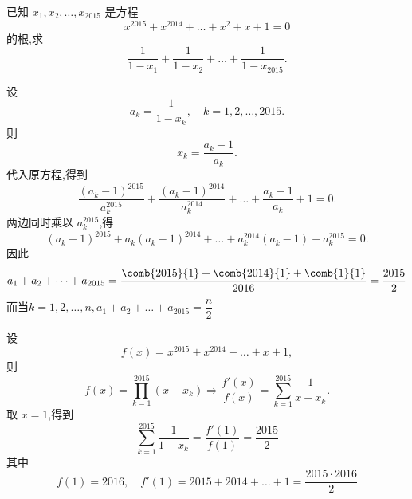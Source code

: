 \begin{questions}
    \question 已知 $x_1, x_2, \ldots, x_{2015}$ 是方程
    \[
    x^{2015}+x^{2014}+\dots+x^2+x+1=0
    \]
    的根,求
    \[
    \frac{1}{1-x_1}+\frac{1}{1-x_2}+\dots+\frac{1}{1-x_{2015}}.
    \]
    \begin{solution}
        设 
        \[
        a_k = \frac{1}{1-x_k}, \quad k=1,2,\dots,2015.
        \]
        则
        \[
        x_k = \frac{a_k-1}{a_k}.
        \]
        代入原方程,得到
        \[
        \frac{(a_k-1)^{2015}}{a_k^{2015}} + \frac{(a_k-1)^{2014}}{a_k^{2014}} + \dots + \frac{a_k-1}{a_k} + 1 = 0.
        \]
        两边同时乘以 $a_k^{2015}$,得
        \[
        (a_k-1)^{2015} + a_k(a_k-1)^{2014} + \dots + a_k^{2014}(a_k-1) + a_k^{2015} = 0.
        \]
        因此
        \[
        a_1 + a_2 + \dots + a_{2015} = \frac{\comb{2015}{1}+\comb{2014}{1}+\comb{1}{1}}{2016} = \frac{2015}{2}
        \]
        而当$k=1,2,\dots,n,a_1 + a_2 + \dots + a_{2015}=\dfrac{n}{2}$
    \end{solution}
    \begin{solution}
        设
        \[
        f(x) = x^{2015}+x^{2014}+\dots+x+1,
        \]
        则
        \[
        f(x) = \prod_{k=1}^{2015}(x-x_k) \Rightarrow \frac{f'(x)}{f(x)} = \sum_{k=1}^{2015} \frac{1}{x-x_k}.
        \]
        取 $x=1$,得到
        \[
        \sum_{k=1}^{2015} \frac{1}{1-x_k} = \frac{f'(1)}{f(1)}= \frac{2015}{2}
        \]
        其中
        \[
        f(1) = 2016, \quad f'(1) = 2015+2014+\dots+1 = \frac{2015\cdot 2016}{2}
        \]
    \end{solution}

    \question 
    \begin{parts}

\end{parts}
\end{questions}
